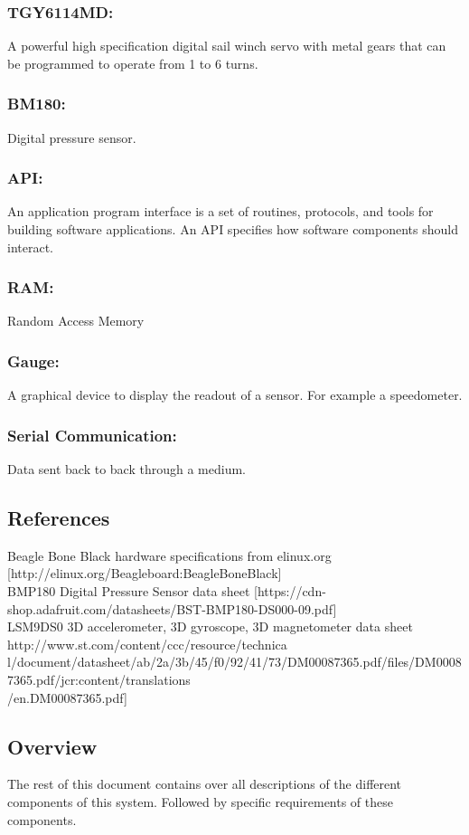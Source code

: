 \documentclass[10pt,draftclsnofoot,onecolumn,retainorgcmds]{IEEEtran}
\begin{document}
\subsubsection{\bf TGY6114MD:}A powerful high specification digital sail winch servo with metal gears that can be programmed to operate from 1 to 6 turns.
\subsubsection{\bf BM180:}Digital pressure sensor.
\subsubsection{\bf API:}An application program interface is a set of routines, protocols, and tools for building software applications. An API specifies how software components should interact.
\subsubsection{\bf RAM:}Random Access Memory
\subsubsection{\bf Gauge:}A graphical device to display the readout of a sensor. For example a speedometer.
\subsubsection{\bf Serial Communication:}Data sent back to back through a medium.

\subsection{ References}
Beagle Bone Black hardware specifications from elinux.org [http://elinux.org/Beagleboard:BeagleBoneBlack]\\
BMP180 Digital Pressure Sensor data sheet [https://cdn-shop.adafruit.com/datasheets/BST-BMP180-DS000-09.pdf]\\
LSM9DS0 3D accelerometer, 3D gyroscope, 3D magnetometer data sheet http://www.st.com/content/ccc/resource/technica\\l/document/datasheet/ab/2a/3b/45/f0/92/41/73/DM00087365.pdf/files/DM00087365.pdf/jcr:content/translations\\/en.DM00087365.pdf]
\subsection{Overview}
The rest of this document contains over all descriptions of the different components of this system. Followed by specific requirements of these components.
\end{document}
